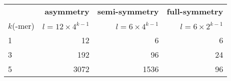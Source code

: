 \begin{table}[ht!]
\centering
\caption{}
\label{tab:sce_symmetric}
\begin{tabulary}{\textwidth}{ lrrr }
\toprule
 & \textbf{asymmetry} & \textbf{semi-symmetry} & \textbf{full-symmetry} \\
 $k$(-mer) & $l = 12 \times 4^{k-1}$ & $l = 6 \times 4^{k-1}$ & $l = 6 \times 2^{k-1}$ \\
\hline

1 & 12 & 6 & 6 \\
3 & 192 & 96 & 24 \\
5 & 3072 & 1536 & 96 \\

\bottomrule

\end{tabulary}
\end{table}
